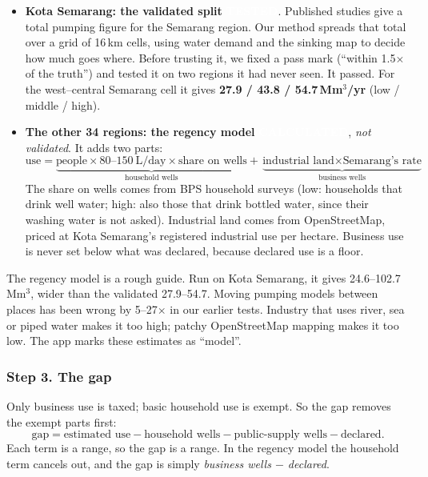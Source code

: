 \documentclass[11pt,a4paper]{article}
\newcommand{\pv}[2]{{\setlength{\fboxsep}{1.3pt}\colorbox{#1}{\textcolor{white}{\sffamily\bfseries\fontsize{6.3}{7}\selectfont #2}}}}
\newcommand{\Tst}{\pv{tested}{TESTED}}
\newcommand{\Calc}{\pv{calc}{CALCULATED}}
\newcommand{\Mm}{\,Mm$^{3}$}
\newcommand{\Mmyr}{\,Mm$^{3}$/yr}
\begin{document}
\begin{itemize}
\item \textbf{Kota Semarang: the validated split} \Tst. Published studies give a total pumping figure for
  the Semarang region. Our method spreads that total over a grid of 16\,km cells, using water demand and
  the sinking map to decide how much goes where. Before trusting it, we fixed a pass mark (``within
  1.5$\times$ of the truth'') and tested it on two regions it had never seen. It passed. For the
  west--central Semarang cell it gives \textbf{27.9 / 43.8 / 54.7\Mmyr} (low / middle / high).
\item \textbf{The other 34 regions: the regency model} \Calc, \emph{not validated}. It adds two parts:
  \[
  \text{use} = \underbrace{\text{people}\times 80\text{--}150\ \text{L/day}\times\text{share on wells}}_{\text{household wells}}
  + \underbrace{\text{industrial land}\times\text{Semarang's rate}}_{\text{business wells}}
  \]
  The share on wells comes from BPS household surveys (low: households that drink well water; high: also
  those that drink bottled water, since their washing water is not asked). Industrial land comes from
  OpenStreetMap, priced at Kota Semarang's registered industrial use per hectare. Business use is never
  set below what was declared, because declared use is a floor.
\end{itemize}

\begin{caution}
The regency model is a rough guide. Run on Kota Semarang, it gives 24.6--102.7\Mm, wider than the validated
27.9--54.7. Moving pumping models between places has been wrong by 5--27$\times$ in our earlier tests.
Industry that uses river, sea or piped water makes it too high; patchy OpenStreetMap mapping makes it too
low. The app marks these estimates as ``model''.
\end{caution}

\subsubsection{Step 3. The gap}
Only business use is taxed; basic household use is exempt. So the gap removes the exempt parts first:
\[
\text{gap} = \text{estimated use} - \text{household wells} - \text{public-supply wells} - \text{declared}.
\]
Each term is a range, so the gap is a range. In the regency model the household term cancels out, and the
gap is simply \emph{business wells $-$ declared}.
\end{document}
